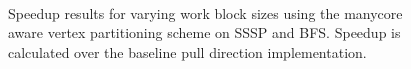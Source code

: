 \begin{figure}[!ht]
    \centering
     \\
    \caption{Speedup results for varying work block sizes using the manycore aware vertex partitioning scheme on SSSP and BFS. Speedup is calculated over the baseline pull direction implementation.}
    \label{pap:generals:sec:eval:fig:cache}
\end{figure}

